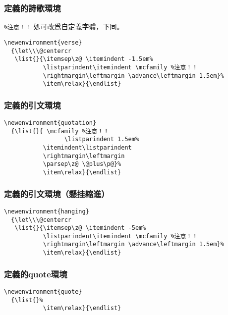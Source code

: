 \subsubsection{定義的詩歌環境}

\par \verb+%注意！！+ 処可改爲自定義字體，下同。
\begin{lstlisting}[firstnumber=840]
\newenvironment{verse}
  {\let\\\@centercr
   \list{}{\itemsep\z@ \itemindent -1.5em%
           \listparindent\itemindent \mcfamily %注意！！
           \rightmargin\leftmargin \advance\leftmargin 1.5em}%
           \item\relax}{\endlist}
\end{lstlisting}

\subsubsection{定義的引文環境}

\begin{lstlisting}[firstnumber=847]
\newenvironment{quotation}
  {\list{}{ \mcfamily %注意！！
  				 \listparindent 1.5em%
           \itemindent\listparindent
           \rightmargin\leftmargin
           \parsep\z@ \@plus\p@}%
           \item\relax}{\endlist}
\end{lstlisting}

\subsubsection{定義的引文環境（懸挂縮進）}

\begin{lstlisting}[firstnumber=856]
\newenvironment{hanging}
  {\let\\\@centercr
   \list{}{\itemsep\z@ \itemindent -5em%
           \listparindent\itemindent \mcfamily %注意！！
           \rightmargin\leftmargin \advance\leftmargin 1.5em}%
           \item\relax}{\endlist}
\end{lstlisting}

\subsubsection{定義的quote環境}

\begin{lstlisting}[firstnumber=863]
\newenvironment{quote}
  {\list{}%
           \item\relax}{\endlist}
\end{lstlisting}

